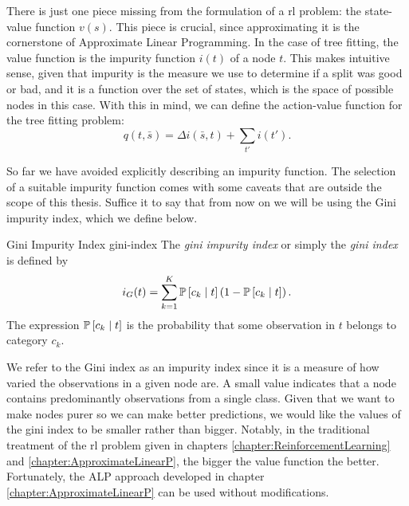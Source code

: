 There is just one piece missing from the formulation of a \ac{rl} problem: the
state-value function $v(s)$. This piece is crucial, since approximating it is
the cornerstone of Approximate Linear Programming. In the case of tree fitting,
the value function is the impurity function $i(t)$ of a node $t$. This makes
intuitive sense, given that impurity is the measure we use to determine if a
split was good or bad, and it is a function over the set of states, which is the
space of possible nodes in this case. With this in mind, we can define the
action-value function for the tree fitting problem:
\begin{equation}
    q (t, \bar{s}) = \Delta i(\bar{s}, t) + \sum_{t'} i (t').
\end{equation}

So far we have avoided explicitly describing an impurity function. The selection
of a suitable impurity function comes with some caveats that are outside the
scope of this thesis. Suffice it to say that from now on we will be using the
Gini impurity index, which we define below.

\begin{dfn}{Gini Impurity Index \cite[Ch.~8.1.2]{intro2statslearning} }{gini-index}
    The \emph{gini impurity index} or simply the \emph{gini index} is defined by
    \begin{equation}
        i_{G}(t) = \sum_{k=1}^{K} \mathbb{P}\left[c_k \mid t\right] \left( 1 - \mathbb{P}\left[c_k \mid t\right] \right).
    \end{equation}
    The expression $\mathbb{P}\left[c_k \mid t\right]$ is the probability that some observation in
    $t$ belongs to category $c_k$.
\end{dfn}

We refer to the Gini index as an impurity index since it is a measure of how
varied the observations in a given node are. A small value indicates that a node
contains predominantly observations from a single class. Given that we want to
make nodes purer so we can make better predictions, we would like the values of
the gini index to be smaller rather than bigger. Notably, in the traditional
treatment of the \ac{rl} problem given in chapters
\ref{chapter:ReinforcementLearning} and \ref{chapter:ApproximateLinearP}, the
bigger the value function the better. Fortunately, the ALP approach developed in
chapter \ref{chapter:ApproximateLinearP} can be used without modifications.


